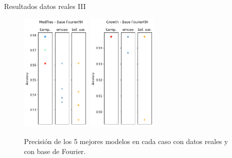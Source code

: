 \documentclass[10pt, spanish, professionalfonts]{beamer}
\begin{document}
\begin{frame}{Resultados datos reales III}
  \begin{figure}
    \includegraphics[width=0.3\textwidth]{img/results/log_medflies_base9}\hspace{5em}
    \includegraphics[width=0.3\textwidth]{img/results/log_growth_base9}
    \caption{Precisión de los 5 mejores modelos en cada caso con datos reales y con base de Fourier.}
  \end{figure}
\end{frame}
\end{document}
